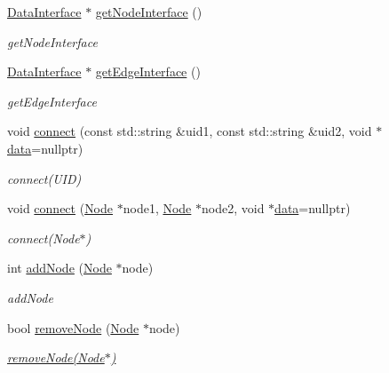 \begin{DoxyCompactItemize}
\mbox{\hyperlink{struct_data_interface}{Data\+Interface}} $\ast$ \mbox{\hyperlink{class_graph_a69e269c872eb3f1cf9d1c941d3e30861}{get\+Node\+Interface}} ()
\begin{DoxyCompactList}\small\item\em get\+Node\+Interface \end{DoxyCompactList}\item 
\mbox{\hyperlink{struct_data_interface}{Data\+Interface}} $\ast$ \mbox{\hyperlink{class_graph_a1654657d157c6abdb0e1791946059c05}{get\+Edge\+Interface}} ()
\begin{DoxyCompactList}\small\item\em get\+Edge\+Interface \end{DoxyCompactList}\item 
void \mbox{\hyperlink{class_graph_a6f487be56c6a426443caa718e33c5399}{connect}} (const std\+::string \&uid1, const std\+::string \&uid2, void $\ast$\mbox{\hyperlink{_graph_8h_a98cbe1f79429fc62806b32b6e8871d9e}{data}}=nullptr)
\begin{DoxyCompactList}\small\item\em connect(\+U\+I\+D) \end{DoxyCompactList}\item 
void \mbox{\hyperlink{class_graph_afedc0da07ed8ca06cf07f202dd83cec4}{connect}} (\mbox{\hyperlink{class_node}{Node}} $\ast$node1, \mbox{\hyperlink{class_node}{Node}} $\ast$node2, void $\ast$\mbox{\hyperlink{_graph_8h_a98cbe1f79429fc62806b32b6e8871d9e}{data}}=nullptr)
\begin{DoxyCompactList}\small\item\em connect(\+Node$\ast$) \end{DoxyCompactList}\item 
int \mbox{\hyperlink{class_graph_a8236fc82b90fdea9b07d4cd0ae189925}{add\+Node}} (\mbox{\hyperlink{class_node}{Node}} $\ast$node)
\begin{DoxyCompactList}\small\item\em add\+Node \end{DoxyCompactList}\item 
bool \mbox{\hyperlink{class_graph_a32b254ea9535f8f4ad831d129db525e8}{remove\+Node}} (\mbox{\hyperlink{class_node}{Node}} $\ast$node)
\begin{DoxyCompactList}\small\item\em \mbox{\hyperlink{class_graph_a32b254ea9535f8f4ad831d129db525e8}{remove\+Node(\+Node$\ast$)}} \end{DoxyCompactList}\item 

\end{DoxyCompactItemize}

